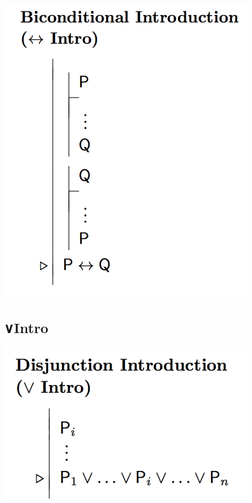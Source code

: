 \documentclass[12pt]{extarticle}
\begin{document}
\begin{multicols*}{3}
\begin{center}
\includegraphics[scale=0.3]{img/rule_biconditional_intro.png}
\end{center}
 
 
\section{∨Intro}
 
\begin{center}
\includegraphics[scale=0.3]{img/rule_disjunction_intro.png}
\end{center}
 

\end{multicols*}
\end{document}
